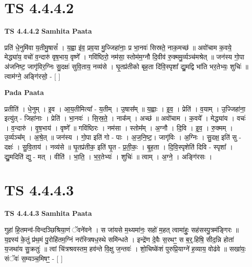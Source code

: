 \documentclass[17pt]{extarticle}
\begin{document}
\section*{ TS 4.4.4.2 }

\textbf{TS 4.4.4.2 } \newline
\textbf{Samhita Paata} \newline

प्रति॑ धे॒नुमि॑वा य॒तीमु॒षासं᳚ । य॒ह्वा इ॑व॒ प्रव॒या मु॒ज्जिहा॑नाः॒ प्र भा॒नवः॑ सिस्रते॒ नाक॒मच्छ॑ ॥ अवो॑चाम क॒वये॒ मेद्ध्या॑य॒ वचो॑ व॒न्दारु॑ वृष॒भाय॒ वृष्णे᳚ । गवि॑ष्ठिरो॒ नम॑सा॒ स्तोम॑म॒ग्नौ दि॒वीव॑ रु॒क्ममु॒र्व्यञ्च॑मश्रेत् ॥ जन॑स्य गो॒पा अ॑जनिष्ट॒ जागृ॑विर॒ग्निः सु॒दक्षः॑ सुवि॒ताय॒ नव्य॑से । घृ॒तप्र॑तीको बृह॒ता दि॑वि॒स्पृशा᳚ द्यु॒मद्वि भा॑ति भर॒तेभ्यः॒ शुचिः॑ ॥ त्वाम॑ग्ने॒ अङ्गि॑रसो॒ - [  ] \newline

\textbf{Pada Paata} \newline

प्रतीति॑ । धे॒नुम् । इ॒व । आ॒य॒तीमित्या᳚ - य॒तीम् । उ॒षास᳚म् ॥ य॒ह्वाः । इ॒व॒ । प्रेति॑ । व॒याम् । उ॒ज्जिहा॑ना॒ इत्यु॑त् - जिहा॑नाः । प्रेति॑ । भा॒नवः॑ । सि॒स्र॒ते॒ । नाक᳚म् । अच्छ॑ ॥ अवो॑चाम । क॒वये᳚ । मेद्ध्या॑य । वचः॑ । व॒न्दारु॑ । वृ॒ष॒भाय॑ । वृष्णे᳚ ॥ गवि॑ष्ठिरः । नम॑सा । स्तोम᳚म् । अ॒ग्नौ । दि॒वि । इ॒व॒ । रु॒क्मम् । उ॒र्व्यञ्च᳚म् । अ॒श्रे॒त् ॥ जन॑स्य । गो॒पा इति॑ गो - पाः । अ॒ज॒नि॒ष्ट॒। जागृ॑विः । अ॒ग्निः । सु॒दक्ष॒ इति॑ सु - दक्षः॑ । सु॒वि॒ताय॑ । नव्य॑से ॥ घृ॒तप्र॑तीक॒ इति॑ घृ॒त - प्र॒ती॒कः॒ । बृ॒ह॒ता । दि॒वि॒स्पृशेति॑ दिवि - स्पृशा᳚ । द्यु॒मदिति॑ द्यु - मत् । वीति॑ । भा॒ति॒ । भ॒र॒तेभ्यः॑ । शुचिः॑ ॥ त्वाम् । अ॒ग्ने॒ । अङ्गि॑रसः ।  \newline




\section*{ TS 4.4.4.3 }

\textbf{TS 4.4.4.3 } \newline
\textbf{Samhita Paata} \newline

गुहा॑ हि॒तमन्व॑-विन्दञ्छिश्रिया॒णं ॅवने॑वने । स जा॑यसे म॒थ्यमा॑नः॒ सहो॑ म॒हत् त्वामा॑हुः॒ सह॑सस्पु॒त्रम॑ङ्गिरः ॥ य॒ज्ञ्स्य॑ के॒तुं प्र॑थ॒मं पु॒रोहि॑तम॒ग्निं नर॑स्त्रिषध॒स्थे समि॑न्धते । इन्द्रे॑ण दे॒वैः स॒रथꣳ॒॒ स ब॒र्॒.हिषि॒ सीद॒न्नि होता॑ य॒जथा॑य सु॒क्रतुः॑ ॥ त्वां चि॑त्रश्रवस्तम॒ हव॑न्ते वि॒क्षु ज॒न्तवः॑ । शो॒चिष्के॑शं पुरुप्रि॒याग्ने॑ ह॒व्याय॒ वोढ॑वे ॥ सखा॑यः॒ संॅवः॑ स॒म्यञ्च॒मिषꣳ॒॒ - [  ] \newline
\end{document}
